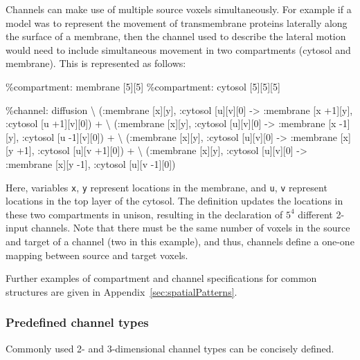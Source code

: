 \documentclass[english]{report}
\def\todr#1{\todo[backgroundcolor=red!10, linecolor=red]{\sf #1}}
\begin{document}
Channels can make use of multiple source voxels simultaneously. For example if a model was to represent the movement of transmembrane proteins laterally along the surface of a membrane, then the channel used to describe the lateral motion would need to include simultaneous movement in two compartments (cytosol and membrane). This is represented as follows:

\begin{kappasource}
\%compartment: membrane [5][5]
\%compartment: cytosol  [5][5][5]

\%channel: diffusion {\textbackslash}
    (:membrane [x][y], :cytosol [u][v][0] -> :membrane [x +1][y], :cytosol [u +1][v][0]) + {\textbackslash}
    (:membrane [x][y], :cytosol [u][v][0] -> :membrane [x -1][y], :cytosol [u -1][v][0]) + {\textbackslash}
    (:membrane [x][y], :cytosol [u][v][0] -> :membrane [x][y +1], :cytosol [u][v +1][0]) + {\textbackslash}
    (:membrane [x][y], :cytosol [u][v][0] -> :membrane [x][y -1], :cytosol [u][v -1][0])
\end{kappasource}

Here, variables \Verb+x+, \Verb+y+ represent locations in the membrane, and \Verb+u+, \Verb+v+ represent locations in the top layer of the cytosol. The definition updates the locations in these two compartments in unison, resulting in the declaration of $5^4$ different 2-input channels. Note that there must be the same number of voxels in the source and target of a channel (two in this example), and thus, channels define a one-one mapping between source and target voxels.


Further examples of compartment and channel specifications for common structures are given in Appendix~\ref{sec:spatialPatterns}.

\subsubsection{Predefined channel types}\label{predefCtype}

Commonly used 2- and 3-dimensional channel types can be concisely defined. 
\end{document}
